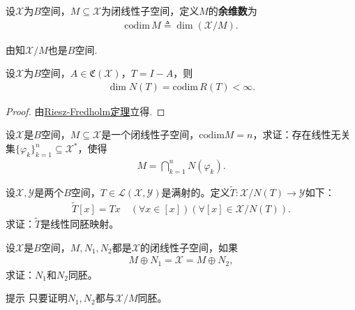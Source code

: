 \documentclass[../../main.tex]{subfiles}%
\begin{document}
\begin{definition}
设$\mathscr{X}$为$B$空间，$M\subseteq\mathscr{X}$为闭线性子空间，定义$M$的\textbf{余维数}为
\begin{align*}
\mathrm{codim}\,M\triangleq\dim(\mathscr{X}/M).
\end{align*}
\end{definition}
\begin{remark}
由知$\mathscr{X}/M$也是$B$空间.
\end{remark}

\begin{theorem}
设$\mathscr{X}$为$B$空间，$A\in\mathfrak{C}(\mathscr{X})$，$T=I-A$，则
\begin{align*}
\dim N(T)=\mathrm{codim}\,R(T)<\infty.
\end{align*}
\end{theorem}
\begin{proof}

由\hyperref[theorem:泛函分析--Riesz-Fredholm定理]{Riesz-Fredholm定理}立得.
\end{proof}

\begin{example}
设$\mathscr{X}$是$B$空间，$M \subseteq \mathscr{X}$是一个闭线性子空间，$\mathrm{codim}M = n$，求证：存在线性无关集$\{\varphi_k\}_{k=1}^{n} \subseteq \mathscr{X}^{*}$，使得
\begin{align*}
M = \bigcap\limits_{k=1}^{n} N(\varphi_k).
\end{align*}
\end{example}

\begin{example}
设$\mathscr{X},\mathscr{Y}$是两个$B$空间，$T \in \mathscr{L}(\mathscr{X},\mathscr{Y})$是满射的。定义$\widetilde{T}: \mathscr{X}/N(T) \to \mathscr{Y}$如下：
\begin{align*}
\widetilde{T}[x] = Tx \quad (\forall x \in [x])(\forall [x] \in \mathscr{X}/N(T)).
\end{align*}
求证：$\widetilde{T}$是线性同胚映射。
\end{example}

\begin{example}
设$\mathscr{X}$是$B$空间，$M,N_1,N_2$都是$\mathscr{X}$的闭线性子空间，如果
\begin{align*}
M \oplus N_1 = \mathscr{X} = M \oplus N_2,
\end{align*}
求证：$N_1$和$N_2$同胚。

提示 只要证明$N_1,N_2$都与$\mathscr{X}/M$同胚。
\end{example}
\end{document}
